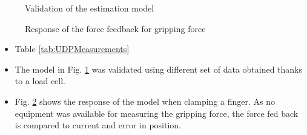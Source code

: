 \begin{minipage}{0.5\linewidth}
\begin{figure}[H]
\centering
\resizebox{0.8\textwidth}{!}{
}
\caption{Validation of the estimation model}
\label{fig:validation}
\end{figure}

\end{minipage}
\begin{minipage}{0.5\linewidth}
\begin{figure}[H]
\centering
\resizebox{0.8\textwidth}{!}{
}
\caption{Response of the force feedback for gripping force}
\label{fig:feedback_meas}
\end{figure}
\end{minipage}

\begin{minipage}{0.5\linewidth}

\begin{center}
	\label{tab:UDPMeasurements}
\end{center}
\end{minipage}

\begin{itemize}
\item Table \ref{tab:UDPMeasurements}
\item The model in Fig. \ref{fig:validation} was validated using different set of data obtained thanks to a load cell.
\item Fig. \ref{fig:feedback_meas} shows the response of the model when clamping a finger. As no equipment was available for measuring the gripping force, the force fed back is compared to current and error in position.
\end{itemize}